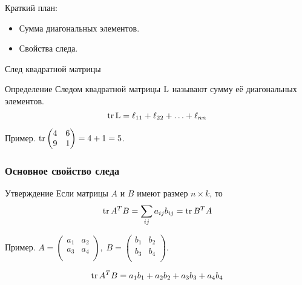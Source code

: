 
\begin{frame} %


\end{frame}



\begin{frame}{Краткий план:}
  \begin{itemize}[<+->] 
    \item Сумма диагональных элементов.
    \item Свойства следа.
  \end{itemize}

\end{frame}


\begin{frame}{След квадратной матрицы}
    \begin{block}{Определение}
        \alert{Следом квадратной матрицы} $\operatorname{L}$ называют сумму её диагональных элементов. 
        \[
            \trace \LL = \ell_{11} + \ell_{22} + \ldots + \ell_{nn}
        \]
    \end{block}

    \pause
    Пример. $\trace \begin{pmatrix}
        4 & 6 \\
        9 & 1
    \end{pmatrix} = 4 + 1 = 5$.

\end{frame}





\begin{frame}
    \frametitle{Основное свойство следа}

    \begin{block}{Утверждение}
        Если матрицы $A$ и $B$ имеют размер $n\times k$, то
        \[
        \trace A^T B = \sum_{ij} a_{ij} b_{ij} = \trace B^T A
        \]

    \end{block}
    \pause

    Пример. $A = \begin{pmatrix}
        a_1 & a_2 \\
        a_3 & a_4 \\ 
    \end{pmatrix},  \;
    B = \begin{pmatrix}
        b_1 & b_2 \\
        b_3 & b_4 \\ 
    \end{pmatrix}$.

    \[
    \trace A^T B = a_1 b_1 + a_2 b_2 + a_3 b_3 + a_4 b_4    
    \]

\end{frame}


